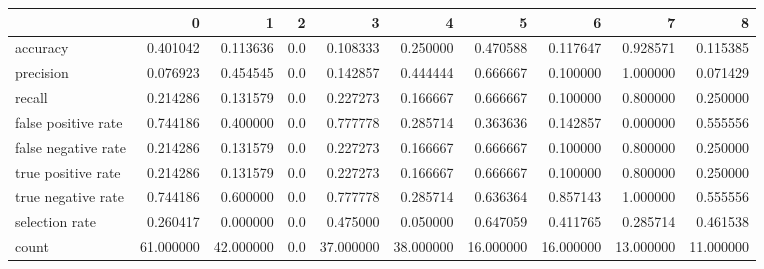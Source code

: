 \begin{tabular}{lrrrrrrrrr}
\toprule
{} &          0 &          1 &    2 &          3 &          4 &          5 &          6 &          7 &          8 \\
\midrule
accuracy            &   0.401042 &   0.113636 &  0.0 &   0.108333 &   0.250000 &   0.470588 &   0.117647 &   0.928571 &   0.115385 \\
precision           &   0.076923 &   0.454545 &  0.0 &   0.142857 &   0.444444 &   0.666667 &   0.100000 &   1.000000 &   0.071429 \\
recall              &   0.214286 &   0.131579 &  0.0 &   0.227273 &   0.166667 &   0.666667 &   0.100000 &   0.800000 &   0.250000 \\
false positive rate &   0.744186 &   0.400000 &  0.0 &   0.777778 &   0.285714 &   0.363636 &   0.142857 &   0.000000 &   0.555556 \\
false negative rate &   0.214286 &   0.131579 &  0.0 &   0.227273 &   0.166667 &   0.666667 &   0.100000 &   0.800000 &   0.250000 \\
true positive rate  &   0.214286 &   0.131579 &  0.0 &   0.227273 &   0.166667 &   0.666667 &   0.100000 &   0.800000 &   0.250000 \\
true negative rate  &   0.744186 &   0.600000 &  0.0 &   0.777778 &   0.285714 &   0.636364 &   0.857143 &   1.000000 &   0.555556 \\
selection rate      &   0.260417 &   0.000000 &  0.0 &   0.475000 &   0.050000 &   0.647059 &   0.411765 &   0.285714 &   0.461538 \\
count               &  61.000000 &  42.000000 &  0.0 &  37.000000 &  38.000000 &  16.000000 &  16.000000 &  13.000000 &  11.000000 \\
\bottomrule
\end{tabular}
